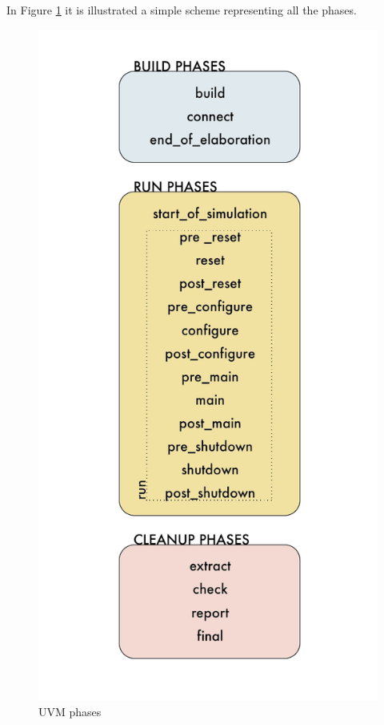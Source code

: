In Figure \ref{phases-uvm} it is illustrated a simple scheme representing all the phases.\\


\begin{figure}[H]
    \centering
    \includegraphics[scale = 0.6]{Chapter_1/img/phases-uvm.png}
    \caption{UVM phases}
    \label{phases-uvm}
\end{figure}


